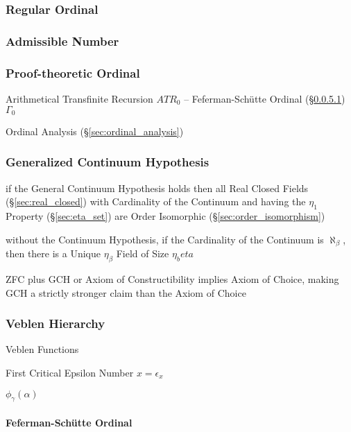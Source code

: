 \subsubsection{Regular Ordinal}\label{sec:regular_ordinal}

\subsubsection{Admissible Number}\label{sec:admissible_ordinal}

\subsubsection{Proof-theoretic Ordinal}\label{sec:proof_ordinal}

Arithmetical Transfinite Recursion $ATR_0$ -- Feferman-Sch\"utte Ordinal
(\S\ref{sec:feferman_schutte}) $\Gamma_0$

Ordinal Analysis (\S\ref{sec:ordinal_analysis})



\subsubsection{Generalized Continuum Hypothesis}
\label{sec:generalized_continuum}

if the General Continuum Hypothesis holds then all Real Closed Fields
(\S\ref{sec:real_closed}) with Cardinality of the Continuum and having the
$\eta_1$ Property (\S\ref{sec:eta_set}) are Order Isomorphic
(\S\ref{sec:order_isomorphism})

without the Continuum Hypothesis, if the Cardinality of the Continuum is
$\aleph_\beta$, then there is a Unique $\eta_\beta$ Field of Size $\eta_beta$

ZFC plus GCH or Axiom of Constructibility implies Axiom of Choice, making GCH a
strictly stronger claim than the Axiom of Choice



\subsubsection{Veblen Hierarchy}\label{sec:veblen_hierarchy}

Veblen Functions %

First Critical Epsilon Number $x = \epsilon_x$ %

$\phi_\gamma(\alpha)$



\paragraph{Feferman-Sch\"utte Ordinal}\label{sec:feferman_schutte}\hfill

